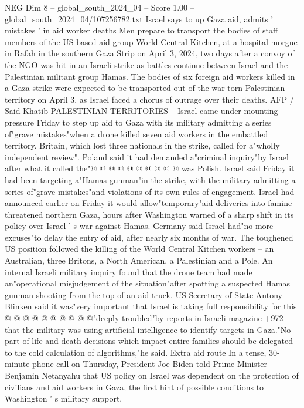 \begin{textsample}{NEG Dim 8 – global\_south\_2024\_04 – Score 1.00 – global\_south\_2024\_04/107256782.txt}  \label{ex:f8_neg_267}
Israel says to up Gaza aid, admits ' mistakes ' in aid worker deaths Men prepare to transport the bodies of staff members of the US-based aid group World Central Kitchen, at a hospital morgue in Rafah in the southern Gaza Strip on April 3, 2024, two days after a convoy of the NGO was hit in an Israeli strike as battles continue between Israel and the Palestinian militant group Hamas.
The bodies of six foreign aid workers killed in a Gaza strike were expected to be transported out of the war-torn Palestinian territory on April 3, as Israel faced a chorus of outrage over their deaths.
AFP / Said Khatib PALESTINIAN TERRITORIES -- Israel came under mounting pressure Friday to step up aid to Gaza with its military admitting a series of"grave mistakes"when a drone killed seven aid workers in the embattled territory.
Britain, which lost three nationals in the strike, called for a"wholly independent review".
Poland said it had demanded a"criminal inquiry"by Israel after what it called the"@ @ @ @ @ @ @ @ @ @ was Polish.
Israel said Friday it had been targeting a"Hamas gunman"in the strike, with the military admitting a series of"grave mistakes"and violations of its own rules of engagement.
Israel had announced earlier on Friday it would allow"temporary"aid deliveries into famine-threatened northern Gaza, hours after Washington warned of a sharp shift in its policy over Israel ' s war against Hamas.
Germany said Israel had"no more excuses"to delay the entry of aid, after nearly six months of war.
The toughened US position followed the killing of the World Central Kitchen workers -- an Australian, three Britons, a North American, a Palestinian and a Pole.
An internal Israeli military inquiry found that the drone team had made an"operational misjudgement of the situation"after spotting a suspected Hamas gunman shooting from the top of an aid truck.
US Secretary of State Antony Blinken said it was"very important that Israel is taking full responsibility for this @ @ @ @ @ @ @ @ @ @"deeply troubled"by reports in Israeli magazine +972 that the military was using artificial intelligence to identify targets in Gaza."No part of life and death decisions which impact entire families should be delegated to the cold calculation of algorithms,"he said.
Extra aid route In a tense, 30-minute phone call on Thursday, President Joe Biden told Prime Minister Benjamin Netanyahu that US policy on Israel was dependent on the protection of civilians and aid workers in Gaza, the first hint of possible conditions to Washington ' s military support.

\end{textsample}
